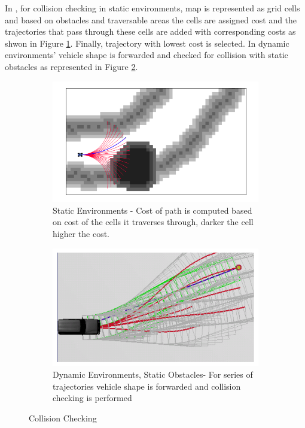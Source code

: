 In \cite{kolski_thesis}, for collision checking in static environments, map is represented as grid cells and based on obstacles and traversable areas the cells are assigned cost and the trajectories that pass through these cells are added with corresponding costs as shwon in Figure \ref{kolski1}. Finally, trajectory with lowest cost is selected. In dynamic environments' vehicle shape is forwarded and checked for collision with static obstacles as represented in Figure \ref{kolski2}.
\begin{figure}
	\centering
	\begin{subfigure}{.50\textwidth}
		\centering
		\includegraphics[width=1.0\linewidth]{Images/related_work/kolskistaticobst.png}
		\caption{Static Environments - Cost of path is computed based on cost of the cells it traverses through, darker the cell higher the cost.}
		\label{kolski1}
	\end{subfigure}%
	\begin{subfigure}{.50\textwidth}
		\centering
		\includegraphics[width=1.0\linewidth]{Images/related_work/dynamiccollsionkolski.png}
		\caption{Dynamic Environments, Static Obstacles- For series of trajectories vehicle shape is forwarded and collision checking is performed}
		\label{kolski2}
	\end{subfigure}
	\caption{Collision Checking \cite{kolski_thesis}}
	\label{kolskicollison}
\end{figure}

